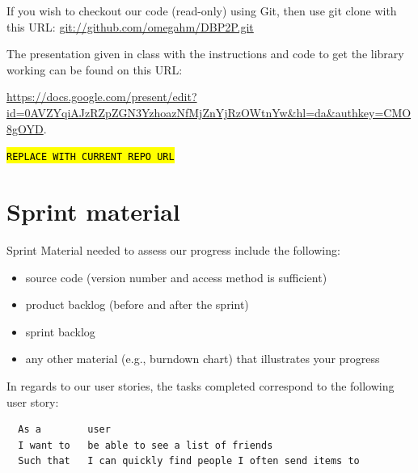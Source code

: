 \documentclass[a4paper,11pt]{article}
\begin{document}
If you wish to checkout our code (read-only) using Git, then use git clone with this URL:
\url{git://github.com/omegahm/DBP2P.git}

The presentation given in class with the instructions and code to get the library working can be found on this URL:

\noindent \url{https://docs.google.com/present/edit?id=0AVZYqiAJzRZpZGN3YzhoazNfMjZnYjRzOWtnYw&hl=da&authkey=CMO8gOYD}.

{ %
\texttt{\hl{REPLACE WITH CURRENT REPO URL}\\}
}


\section{Sprint material}
Sprint Material needed to assess our progress include the following:
\begin{itemize}
\item source code (version number and access method is sufficient)
\item product backlog (before and after the sprint)
\item sprint backlog
\item any other material (e.g., burndown chart) that illustrates your progress
\end{itemize}




In regards to our user stories, the tasks completed correspond to the following user story:
\begin{verbatim}
  As a        user
  I want to   be able to see a list of friends
  Such that   I can quickly find people I often send items to
\end{verbatim}
\end{document}

